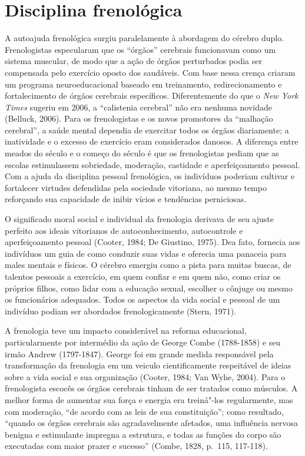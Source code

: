 \section{Disciplina frenológica}

A autoajuda frenológica surgiu paralelamente à abordagem do cérebro
duplo. Frenologistas especularam que os ``órgãos'' cerebrais funcionavam
como um sistema muscular, de modo que a ação de órgãos perturbados podia
ser compensada pelo exercício oposto dos saudáveis. Com base nessa
crença criaram um programa neuroeducacional baseado em treinamento,
redirecionamento e fortalecimento de órgãos cerebrais específicos.
Diferentemente do que o \emph{New York Times} sugeriu em 2006, a
``calistenia cerebral'' não era nenhuma novidade (Belluck, 2006). Para
os frenologistas e os novos promotores da ``malhação cerebral'', a saúde
mental dependia de exercitar todos os órgãos diariamente; a inatividade
e o excesso de exercício eram considerados danosos. A diferença entre
meados do século  e o começo do século  é que os frenologistas
pediam que as escolas estimulassem sobriedade, moderação, castidade e
aperfeiçoamento pessoal. Com a ajuda da disciplina pessoal frenológica,
os indivíduos poderiam cultivar e fortalecer virtudes defendidas pela
sociedade vitoriana, ao mesmo tempo reforçando sua capacidade de inibir
vícios e tendências perniciosas.

O significado moral social e individual da frenologia derivava de seu
ajuste perfeito aos ideais vitorianos de autoconhecimento, autocontrole
e aperfeiçoamento pessoal (Cooter, 1984; De Giustino, 1975). Dea fato,
fornecia aos indivíduos um guia de como conduzir suas vidas e oferecia
uma panaceia para males mentais e físicos. O cérebro emergiu como a
pista para muitas buscas, de talentos pessoais a exercício, em quem
confiar e em quem não, como criar os próprios filhos, como lidar com a
educação sexual, escolher o cônjuge ou mesmo os funcionários adequados.
Todos os aspectos da vida social e pessoal de um indivíduo podiam ser
abordados frenologicamente (Stern, 1971).

A frenologia teve um impacto considerável na reforma educacional,
particularmente por intermédio da ação de George Combe (1788-1858) e seu
irmão Andrew (1797-1847). George foi em grande medida responsável pela
transformação da frenologia em um veiculo cientificamente respeitável de
ideias sobre a vida social e sua organização (Cooter, 1984; Van Wyhe,
2004). Para o frenologista escocês os órgãos cerebrais tinham de ser
tratados como músculos. A melhor forma de aumentar sua força e energia
era treiná"-los regularmente, mas com moderação, ``de acordo com as leis
de sua constituição''; como resultado, ``quando os órgãos cerebrais são
agradavelmente afetados, uma influência nervosa benigna e estimulante
impregna a estrutura, e todas as funções do corpo são executadas com
maior prazer e sucesso'' (Combe, 1828, p.~115, 117-118).

